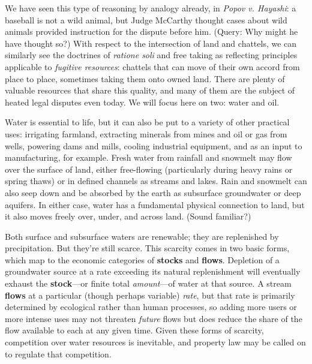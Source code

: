 We have seen this type of reasoning by analogy already, in
\textit{Popov v.
Hayashi}: a baseball is not a wild animal, but Judge McCarthy thought cases
about wild animals provided instruction for the dispute before him. (Query: Why
might he have thought so?) With respect to the intersection of land and
chattels, we can similarly see the doctrines of
\textit{ratione soli} and free taking as reflecting principles applicable to
\textit{fugitive resources}: chattels that can move of their own accord from
place to place, sometimes taking them onto owned land. There are plenty of
valuable resources that share this quality, and many of them are the subject of
heated legal disputes even today. We will focus here on two: water and oil.

Water is essential to life, but it can also be put to a variety of other
practical uses: irrigating farmland, extracting minerals from mines and oil or
gas from wells, powering dams and mills, cooling industrial equipment, and as an
input to manufacturing, for example. Fresh water from rainfall and snowmelt may
flow over the surface of land, either free-flowing (particularly during heavy
rains or spring thaws) or in defined channels as streams and lakes. Rain and
snowmelt can also seep down and be absorbed by the earth as subsurface
groundwater or deep aquifers. In either case, water has a fundamental physical
connection to land, but it also moves freely over, under, and across land.
(Sound familiar?)

Both surface and subsurface waters are renewable; they are replenished by
precipitation. But they're still scarce. This scarcity comes in two basic forms,
which map to the economic categories of \textbf{stocks} and \textbf{flows}.
Depletion of a groundwater source at a rate exceeding its natural replenishment
will eventually exhaust the \textbf{stock}---or finite total
\textit{amount}---of water at that source. A stream \textbf{flows} at a
particular (though perhaps variable) \textit{rate}, but that rate is primarily
determined by ecological rather than human processes, so adding more users or
more intense uses may not threaten \textit{future} flows but does reduce the
share of the flow available to each at any given time. Given these forms of
scarcity, competition over water resources is inevitable, and property law may
be called on to regulate that competition.

